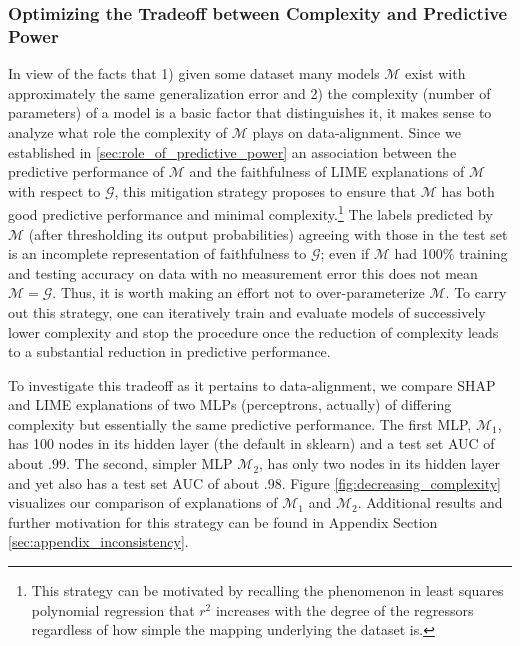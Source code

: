 \documentclass[mnsc,blindrev]{informs3}
\begin{document}
        \subsubsection{Optimizing the Tradeoff between Complexity and Predictive Power}
            \label{sec:decreasing_complexity}
            In view of the facts that 1) given some dataset many models $\mathcal{M}$ exist with approximately the same generalization error and 2) the complexity (number of parameters) of a model is a basic factor that distinguishes it, it makes sense to analyze what role the complexity of $\mathcal{M}$ plays on data-alignment. Since we established in \ref{sec:role_of_predictive_power} an association between the predictive performance of $\mathcal{M}$ and the faithfulness of LIME explanations of $\mathcal{M}$ with respect to $\mathcal{G}$, this mitigation strategy proposes to ensure that $\mathcal{M}$ has both good predictive performance and minimal complexity.\footnote{This strategy can be motivated by recalling the phenomenon in least squares polynomial regression that $r^2$ increases with the degree of the regressors regardless of how simple the mapping underlying the dataset is.} The labels predicted by $\mathcal{M}$ (after thresholding its output probabilities) agreeing with those in the test set is an incomplete representation of faithfulness to $\mathcal{G}$; even if $\mathcal{M}$ had 100\% training and testing accuracy on data with no measurement error this does not mean $\mathcal{M}=\mathcal{G}$. Thus, it is worth making an effort not to over-parameterize $\mathcal{M}$. To carry out this strategy, one can iteratively train and evaluate models of successively lower complexity and stop the procedure once the reduction of complexity leads to a substantial reduction in predictive performance. 
            
            To investigate this tradeoff as it pertains to data-alignment, we compare SHAP and LIME explanations of two MLPs (perceptrons, actually) of differing complexity but essentially the same predictive performance. The first MLP, $\mathcal{M}_1$, has 100 nodes in its hidden layer (the default in sklearn) and a test set AUC of about $.99$. The second, simpler MLP $\mathcal{M}_2$, has only two nodes in its hidden layer and yet also has a test set AUC of about $.98$. Figure \ref{fig:decreasing_complexity} visualizes our comparison of explanations of $\mathcal{M}_1$ and $\mathcal{M}_2$. Additional results and further motivation for this strategy can be found in Appendix Section \ref{sec:appendix_inconsistency}.
\end{document}
